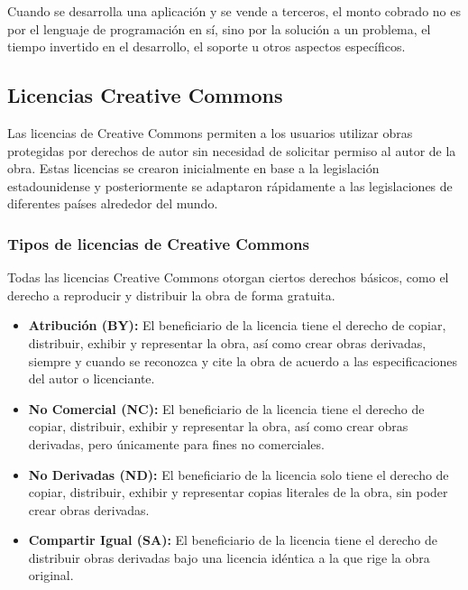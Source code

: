 				Cuando se desarrolla una aplicación y se vende a terceros, el monto cobrado no es por el lenguaje de programación en sí, sino por la solución a un problema, el tiempo invertido en el desarrollo, el soporte u otros aspectos específicos.\par

	
		\subsection{Licencias Creative Commons}
		
				Las licencias de Creative Commons permiten a los usuarios utilizar obras protegidas por derechos de autor sin necesidad de solicitar permiso al autor de la obra. Estas licencias se crearon inicialmente en base a la legislación estadounidense y posteriormente se adaptaron rápidamente a las legislaciones de diferentes países alrededor del mundo.
			
			\subsubsection{Tipos de licencias de Creative Commons} 
			
				Todas las licencias Creative Commons otorgan ciertos derechos básicos, como el derecho a reproducir y distribuir la obra de forma gratuita.\par 
					
						\begin{itemize}
						
    						\item \textbf{Atribución (BY):} El beneficiario de la licencia tiene el derecho de copiar, distribuir, exhibir y representar la obra, así como crear obras derivadas, siempre y cuando se reconozca y cite la obra de acuerdo a las especificaciones del autor o licenciante.

    						\item \textbf{No Comercial (NC):} El beneficiario de la licencia tiene el derecho de copiar, distribuir, exhibir y representar la obra, así como crear obras derivadas, pero únicamente para fines no comerciales.

    						\item \textbf{No Derivadas (ND):} El beneficiario de la licencia solo tiene el derecho de copiar, distribuir, exhibir y representar copias literales de la obra, sin poder crear obras derivadas.

    						\item \textbf{Compartir Igual (SA):} El beneficiario de la licencia tiene el derecho de distribuir obras derivadas bajo una licencia idéntica a la que rige la obra original.				

					\end{itemize}